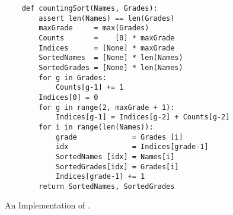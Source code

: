 \begin{figure}[!ht]
\centering
\begin{verbatim}
    def countingSort(Names, Grades):
        assert len(Names) == len(Grades)
        maxGrade     = max(Grades)
        Counts       =    [0] * maxGrade
        Indices      = [None] * maxGrade
        SortedNames  = [None] * len(Names)
        SortedGrades = [None] * len(Names)
        for g in Grades:
            Counts[g-1] += 1
        Indices[0] = 0
        for g in range(2, maxGrade + 1):
            Indices[g-1] = Indices[g-2] + Counts[g-2]
        for i in range(len(Names)):
            grade             = Grades [i]
            idx               = Indices[grade-1]
            SortedNames [idx] = Names[i]
            SortedGrades[idx] = Grades[i]
            Indices[grade-1] += 1
        return SortedNames, SortedGrades
\end{verbatim}
\vspace*{-0.3cm}
\caption{An Implementation of .}
\label{fig:counting-sort.stlx}
\end{figure}

